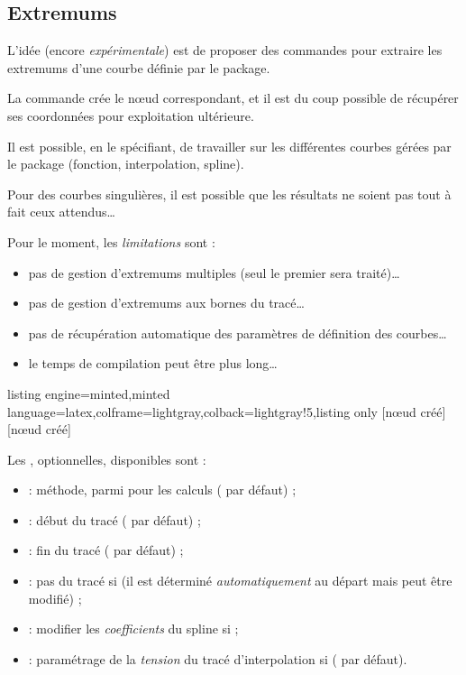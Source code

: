 \documentclass[11pt,a4paper]{ltxdoc}
\begin{document}
\pagebreak

\subsection{Extremums}\label{maximum}\label{minimum}

L'idée (encore \textit{expérimentale}) est de proposer des commandes pour extraire les extremums d'une courbe définie par le package.

La commande crée le nœud correspondant, et il est du coup possible de récupérer ses coordonnées pour exploitation ultérieure.

\smallskip

Il est possible, en le spécifiant, de travailler sur les différentes courbes gérées par le package (fonction, interpolation, spline).

Pour des courbes singulières, il est possible que les résultats ne soient pas tout à fait ceux attendus\ldots

\smallskip

{\small\faBomb} Pour le moment, les \textit{limitations} sont :

\begin{itemize}
	\item pas de gestion d'extremums multiples (seul le premier sera traité)\ldots
	\item pas de gestion d'extremums aux bornes du tracé\ldots
	\item pas de récupération automatique des paramètres de définition des courbes\ldots
	\item le temps de compilation peut être plus long\ldots
\end{itemize}

\begin{tcblisting}{listing engine=minted,minted language=latex,colframe=lightgray,colback=lightgray!5,listing only}
[nœud créé]
[nœud créé]
\end{tcblisting}

Les \MontreCode{[clés]}, optionnelles, disponibles sont :

\smallskip

\begin{itemize}
	\item {} : méthode, parmi  pour les calculs ( par défaut) ;
	\item {} : début du tracé ( par défaut) ;
	\item {} : fin du tracé ( par défaut) ;
	\item {} : pas du tracé si  (il est déterminé \textit{automatiquement} au départ mais peut être modifié) ;
	\item {} : modifier les \textit{coefficients} du spline si  ;
	\item {} : paramétrage de la \textit{tension} du tracé d'interpolation si ( par défaut).
\end{itemize}
\end{document}
